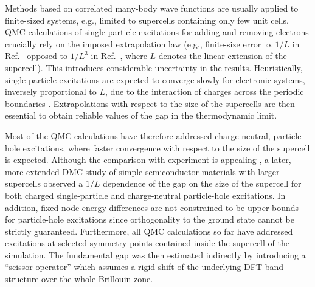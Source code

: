 Methods based on correlated many-body wave functions
are usually applied to finite-sized systems, e.g.,
limited to supercells containing only few unit cells.
QMC calculations of single-particle excitations for adding and removing electrons 
\cite{Kent98,Kent99,Mitra15,McMinis15} crucially rely on the imposed extrapolation law
(e.g., finite-size error $\propto 1/L$ in Ref.~\cite{McMinis15} opposed to $1/L^3$ in Ref.~\cite{Mitra15}, where $L$ denotes the linear extension of the supercell). This introduces considerable uncertainty in the results.
Heuristically, single-particle excitations are expected to converge slowly for electronic systems,
inversely proportional to $L$,
due to the interaction of charges across the periodic boundaries \cite{Payne,Engel}.
Extrapolations with respect to the size of the supercells are then
essential to obtain reliable values of the gap in the thermodynamic limit.

Most of the QMC calculations 
\cite{Ceperley87,Mitas94,Williamson98,Towler2000,Kolorenc08,Ma13,Wagner14,Yu15,Zheng18,Frank19} 
have therefore addressed charge-neutral, particle-hole excitations,
where faster convergence with respect to the size of the supercell is expected.
Although the comparison with experiment is appealing \cite{rev3}, 
a later, more extended DMC study \cite{Hunt} of simple semiconductor materials
with larger supercells observed a $1/L$ dependence of the gap on the size of the supercell
for both charged single-particle and charge-neutral particle-hole excitations.
In addition, 
fixed-node energy differences are not constrained to be upper bounds for particle-hole excitations
\cite{Foulkes99} since orthogonality to the ground state cannot be strictly guaranteed.
Furthermore, all QMC calculations so far have addressed excitations at selected
symmetry points contained inside the supercell of the simulation.
The fundamental gap was then estimated indirectly by introducing 
a ``scissor operator'' \cite{Azadi2017} which assumes a rigid shift of
the underlying DFT band structure over the whole Brillouin zone.

